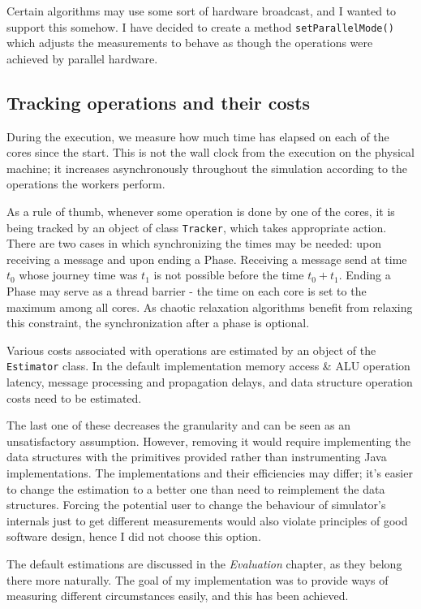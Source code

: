 \documentclass[12pt,a4paper,twoside,openright]{report}
\begin{document}
Certain algorithms may use some sort of hardware broadcast, and I wanted to support this somehow. I have decided to create a method \texttt{setParallelMode()} which adjusts the measurements to behave as though the operations were achieved by parallel hardware.

\subsection{Tracking operations and their costs}
During the execution, we measure how much time has elapsed on each of the cores since the start. This is not the wall clock from the execution on the physical machine; it increases asynchronously throughout the simulation according to the operations the workers perform.

As a rule of thumb, whenever some operation is done by one of the cores, it is being tracked by an object of class \texttt{Tracker}, which takes appropriate action. There are two cases in which synchronizing the times may be needed: upon receiving a message and upon ending a Phase. Receiving a message send at time $t_0$ whose journey time was $t_1$ is not possible before the time $t_0+t_1$. Ending a Phase may serve as a thread barrier - the time on each core is set to the maximum among all cores. As chaotic relaxation algorithms benefit from relaxing this constraint, the synchronization after a phase is optional.

Various costs associated with operations are estimated by an object of the \texttt{Estimator} class. In the default implementation memory access \& ALU operation latency, message processing and propagation delays, and data structure operation costs need to be estimated. 

The last one of these decreases the granularity and can be seen as an unsatisfactory assumption. However, removing it would require implementing the data structures with the primitives provided rather than instrumenting Java implementations. The implementations and their efficiencies may differ; it's easier to change the estimation to a better one than need to reimplement the data structures. Forcing the potential user to change the behaviour of simulator's internals just to get different measurements would also violate principles of good software design, hence I did not choose this option.

The default estimations are discussed in the \textit{Evaluation} chapter, as they belong there more naturally. The goal of my implementation was to provide ways of measuring different circumstances easily, and this has been achieved.
\end{document}
